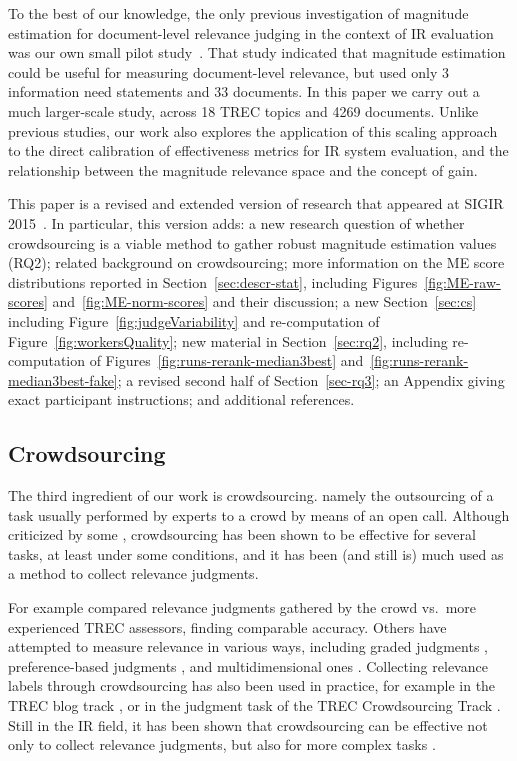 To the best of our knowledge, the only previous investigation of
magnitude estimation for document-level relevance judging in the
context of IR evaluation was our own small pilot study~\cite{SchMad14,MadMiz15}.
That study indicated that 
magnitude estimation could be useful for
measuring document-level relevance, but used only 
3 information need statements and 33 documents.
In this paper we carry out a much larger-scale study, across 18 TREC
topics and 4269 documents.
Unlike previous studies, 
our work also explores the application of this scaling approach to the
direct calibration of effectiveness metrics for IR system evaluation,
and the relationship between the magnitude relevance space and the
concept of gain.

This paper is a revised and extended version of
research that appeared at SIGIR 2015~\cite{ME-SIGIR15}.
In particular, this version adds: a new research question of whether
crowdsourcing is a viable method to gather robust magnitude estimation
values (RQ2); related background on crowdsourcing; more information on
the ME score distributions reported in Section~\ref{sec:descr-stat},
including Figures~\ref{fig:ME-raw-scores} and~\ref{fig:ME-norm-scores}
and their discussion; a new Section~\ref{sec:cs} including
Figure~\ref{fig:judgeVariability} and re-computation of
Figure~\ref{fig:workersQuality}; new material in Section~\ref{sec:rq2},
including re-computation of Figures~\ref{fig:runs-rerank-median3best}
and~\ref{fig:runs-rerank-median3best-fake}; a revised second half of
Section~\ref{sec-rq3}; an Appendix giving exact participant
instructions; and additional references.


\subsection{Crowdsourcing}
\label{sec:crowdsourcing}

The third ingredient of our work is crowdsourcing. 
namely the outsourcing of a task usually performed by experts to a
crowd by means of an open call. 
Although criticized by some \cite{keen2008}, crowdsourcing has been
shown to be effective for several tasks, at least under some
conditions, and
it has been (and still is) much used as a method to collect relevance
judgments. 

For example \citet{Alonso:2012} compared relevance judgments gathered
by the crowd vs.\ more experienced TREC assessors, finding comparable
accuracy. 
Others have attempted to measure relevance in various ways, including
graded judgments \cite{mccreadie:2011}, preference-based judgments
\cite{Anderton2012}, and multidimensional ones \cite{Zhang2014}.
Collecting relevance labels through crowdsourcing has also been used
in practice, for example in the TREC blog track \cite{mccreadie:2011},
or in the judgment task of the TREC Crowdsourcing Track
\cite{Smucker2014}. 
Still in the IR field, it has been shown that crowdsourcing can be
effective not only to collect relevance judgments, but also for more
complex tasks \cite{Zuccon:2013}.


